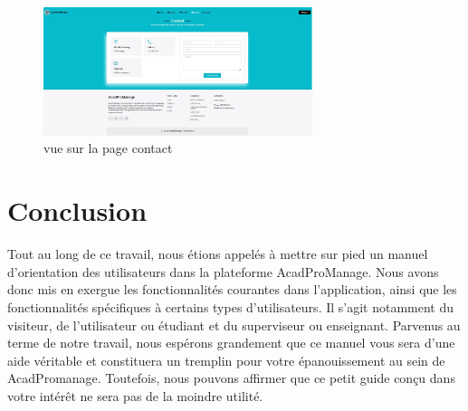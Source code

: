 \documentclass[12pt]{article}
\begin{document}
        \begin{figure}[h!]
            \centering
            \includegraphics[width=0.7\textwidth]{images/page-contact.jpg}
            \caption{vue sur la page contact}
            \label{page contact}
        \end{figure}     
\newpage
{\fontsize{14}{16}\section*{Conclusion}}

Tout au long de ce travail, nous étions appelés à mettre sur pied un manuel d'orientation des utilisateurs dans la plateforme AcadProManage. Nous avons donc mis en exergue les fonctionnalités courantes dans l'application, ainsi que les fonctionnalités spécifiques à certains types d'utilisateurs. Il s'agit notamment du visiteur, de l'utilisateur ou étudiant et du superviseur ou enseignant. Parvenus au terme de notre travail, nous espérons grandement que ce manuel vous sera d'une aide véritable et constituera un tremplin pour votre épanouissement au sein de AcadPromanage. Toutefois, nous pouvons affirmer que ce petit guide conçu dans votre intérêt ne sera pas de la moindre utilité.
\end{document}
